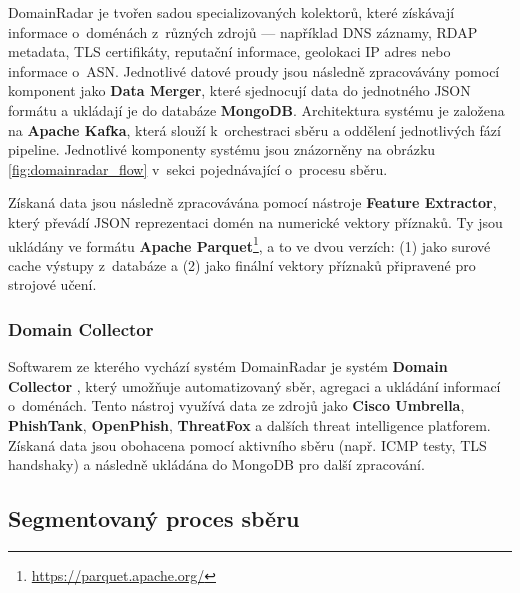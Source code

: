 DomainRadar je tvořen sadou specializovaných kolektorů, které získávají informace o~doménách z~různých zdrojů — například DNS záznamy, RDAP metadata, TLS certifikáty, reputační informace, geolokaci IP adres nebo informace o~ASN. Jednotlivé datové proudy jsou následně zpracovávány pomocí komponent jako \textbf{Data Merger}, které sjednocují data do jednotného JSON formátu a ukládají je do databáze \textbf{MongoDB}. Architektura systému je založena na \textbf{Apache Kafka}, která slouží k~orchestraci sběru a oddělení jednotlivých fází pipeline. Jednotlivé komponenty systému jsou znázorněny na obrázku \ref{fig:domainradar_flow} v~sekci pojednávající o~procesu sběru. 

Získaná data jsou následně zpracovávána pomocí nástroje \textbf{Feature Extractor}, který převádí JSON reprezentaci domén na numerické vektory příznaků. Ty jsou ukládány ve formátu \textbf{Apache Parquet}\footnote{\url{https://parquet.apache.org/}}, a to ve dvou verzích: (1) jako surové cache výstupy z~databáze a (2) jako finální vektory příznaků připravené pro strojové učení. 



\subsubsection{Domain Collector}

Softwarem ze kterého vychází systém DomainRadar je systém \textbf{Domain Collector} \cite{fit-vut-product-784}, který umožňuje automatizovaný sběr, agregaci a ukládání informací o~doménách. Tento nástroj využívá data ze zdrojů jako \textbf{Cisco Umbrella}, \textbf{PhishTank}, \textbf{OpenPhish}, \textbf{ThreatFox} a dalších threat intelligence platforem. Získaná data jsou obohacena pomocí aktivního sběru (např. ICMP testy, TLS handshaky) a následně ukládána do MongoDB pro další zpracování.


\subsection{Segmentovaný proces sběru}
\label{subsection:colect}

